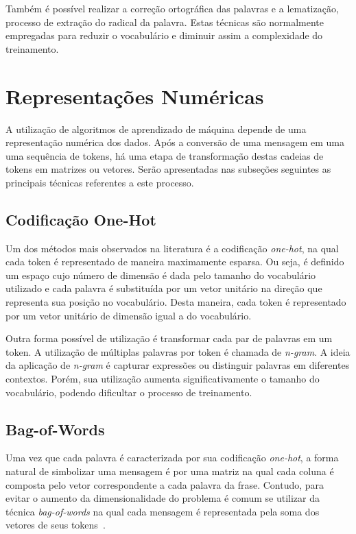 Também é possível realizar a correção ortográfica das palavras e a lematização, processo de extração do radical da
palavra.
Estas técnicas são normalmente empregadas para reduzir o vocabulário e diminuir assim a complexidade do treinamento.

\section{Representações Numéricas}

A utilização de algoritmos de aprendizado de máquina depende de uma representação numérica dos dados.
Após a conversão de uma mensagem em uma uma sequência de tokens, há uma etapa de transformação destas cadeias
de tokens em matrizes ou vetores.
Serão apresentadas nas subseções seguintes as principais técnicas referentes a este processo.

\subsection{Codificação One-Hot}

Um dos métodos mais observados na literatura é a codificação \textit{one-hot}, na qual cada token é representado de
maneira maximamente esparsa.
Ou seja, é definido um espaço cujo número de dimensão é dada pelo tamanho do vocabulário utilizado e cada palavra é
substituída por um vetor unitário na direção que representa sua posição no vocabulário.
Desta maneira, cada token é representado por um vetor unitário de dimensão igual a do vocabulário.

Outra forma possível de utilização é transformar cada par de palavras em um token.
A utilização de múltiplas palavras por token é chamada de \textit{n-gram}.
A ideia da aplicação de \textit{n-gram} é capturar expressões ou distinguir palavras em diferentes contextos.
Porém, sua utilização aumenta significativamente o tamanho do vocabulário, podendo dificultar o processo de treinamento.

\subsection{Bag-of-Words}

Uma vez que cada palavra é caracterizada por sua codificação \textit{one-hot}, a forma natural de simbolizar uma mensagem
é por uma matriz na qual cada coluna é composta pelo vetor correspondente a cada palavra da frase.
Contudo, para evitar o aumento da dimensionalidade do problema é comum se utilizar da técnica \textit{bag-of-words} na
qual cada mensagem é representada pela soma dos vetores de seus tokens~\cite{schutze08}.

